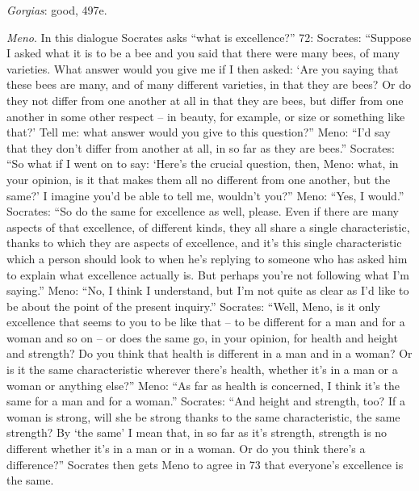 \documentclass{article}
\theoremstyle{definition}
\begin{document}
{\em Gorgias}: good, 497e.

{\em Meno}. In this  dialogue Socrates asks ``what is excellence?''  72: Socrates: ``Suppose I asked what it is to be a bee and you said that there were many
bees, of many varieties. What answer would you give me if I then asked: `Are you saying that these bees are many,
and of many different varieties, in that they are bees? Or do they not differ from one another at all in that they are bees, but differ from
one another in some other respect -- in beauty, for example, or size or something like that?' Tell me: what answer would you give to this
question?'' Meno: ``I'd say that they don't differ from another at all, in so far as they are bees.'' Socrates: ``So what if I went
on to say: `Here's the crucial question, then, Meno: what, in your opinion, is it that makes them all no different from one another, but 
the same?' I imagine you'd be able to tell me, wouldn't you?'' Meno: ``Yes, I would.'' Socrates: ``So do the same
for excellence as well, please. Even if there are many aspects of that excellence, of different kinds, they all share a single
characteristic, thanks to which they are aspects of excellence, and it's this single characteristic which a person should look to when he's replying
to someone who has asked him to explain what excellence actually is. But perhaps you're not following what I'm saying.'' Meno: ``No,
I think I understand, but I'm not quite as clear as I'd like to be about the point of the present inquiry.''
Socrates: ``Well, Meno, is it only excellence that seems to you to be like that -- to be different for a man and for a woman and so on
-- or does the same go, in your opinion, for health and height and strength? Do you think that health is different in a man and in a woman? Or is
it the same characteristic wherever there's health, whether it's in a man or a woman or anything else?'' Meno: ``As far as health is
concerned, I think it's the same for a man and for a woman.'' Socrates: ``And height and strength, too? If a woman is strong, will she
be strong thanks to the same characteristic, the same strength? By `the same' I mean that, in so far as it's strength, strength is no different
whether it's in a man or in a woman. Or do you think there's a difference?''
Socrates then gets Meno to agree in 73 that everyone's excellence is the same. \cite[pp.~101--103]{waterfieldmeno}
\end{document}
